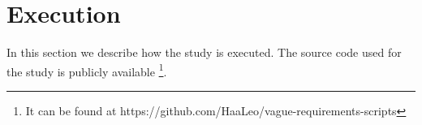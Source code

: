 \section{Execution}
\label{chp:study:sec:execution}
In this section we describe how the study is executed.
The source code used for the study is publicly available \footnote{It can be found at https://github.com/HaaLeo/vague-requirements-scripts}.



